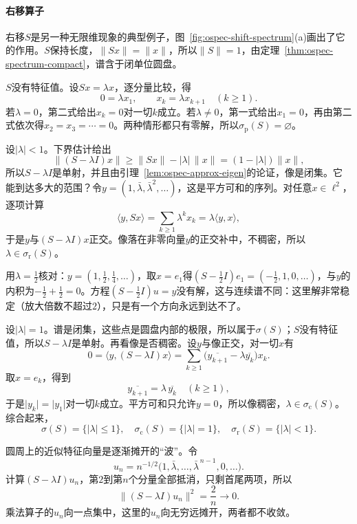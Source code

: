 \paragraph{右移算子}
右移$S$是另一种无限维现象的典型例子，图~\ref{fig:ospec-shift-spectrum}(a)画出了它的作用。$S$保持长度，$\lVert Sx\rVert=\lVert x\rVert$，所以$\lVert S\rVert=1$，由定理~\ref{thm:ospec-spectrum-compact}，谱含于闭单位圆盘。

$S$没有特征值。设$Sx=\lambda x$，逐分量比较，得
\[
0=\lambda x_1,\qquad x_k=\lambda x_{k+1}\quad(k\geq1).
\]
若$\lambda=0$，第二式给出$x_k=0$对一切$k$成立。若$\lambda\neq0$，第一式给出$x_1=0$，再由第二式依次得$x_2=x_3=\cdots=0$。两种情形都只有零解，所以$\sigma_{\mathrm p}(S)=\varnothing$。

设$\lvert\lambda\rvert<1$。下界估计给出
\[
\lVert(S-\lambda I)x\rVert\geq\lVert Sx\rVert-\lvert\lambda\rvert\,\lVert x\rVert=(1-\lvert\lambda\rvert)\lVert x\rVert,
\]
所以$S-\lambda I$是单射，并且由引理~\ref{lem:ospec-approx-eigen}的论证，像是闭集。它能到达多大的范围？令$y=(1,\bar\lambda,\bar\lambda^2,\ldots)$，这是平方可和的序列。对任意$x\in\ell^2$，逐项计算
\[
\langle y,Sx\rangle=\sum_{k\geq1}\lambda^kx_k=\lambda\langle y,x\rangle,
\]
于是$y$与$(S-\lambda I)x$正交。像落在非零向量$y$的正交补中，不稠密，所以$\lambda\in\sigma_{\mathrm r}(S)$。

用$\lambda=\frac12$核对：$y=(1,\frac12,\frac14,\ldots)$，取$x=e_1$得$(S-\frac12I)e_1=(-\frac12,1,0,\ldots)$，与$y$的内积为$-\frac12+\frac12=0$。方程$(S-\frac12I)u=y$没有解，这与连续谱不同：这里解非常稳定（放大倍数不超过$2$），只是有一个方向永远到达不了。

设$\lvert\lambda\rvert=1$。谱是闭集，这些点是圆盘内部的极限，所以属于$\sigma(S)$；$S$没有特征值，所以$S-\lambda I$是单射。再看像是否稠密。设$y$与像正交，对一切$x$有
\[
0=\langle y,(S-\lambda I)x\rangle=\sum_{k\geq1}\bigl(\overline{y_{k+1}}-\lambda\overline{y_k}\bigr)x_k .
\]
取$x=e_k$，得到
\[
\overline{y_{k+1}}=\lambda\,\overline{y_k}\quad(k\geq1),
\]
于是$\lvert y_k\rvert=\lvert y_1\rvert$对一切$k$成立。平方可和只允许$y=0$，所以像稠密，$\lambda\in\sigma_{\mathrm c}(S)$。综合起来，
\begin{equation}
\sigma(S)=\{\lvert\lambda\rvert\leq1\},\quad\sigma_{\mathrm c}(S)=\{\lvert\lambda\rvert=1\},\quad\sigma_{\mathrm r}(S)=\{\lvert\lambda\rvert<1\}.
\label{eq:ospec-shift-spectrum}
\end{equation}

圆周上的近似特征向量是逐渐摊开的“波”。令
\[
u_n=n^{-1/2}\bigl(1,\bar\lambda,\ldots,\bar\lambda^{\,n-1},0,\ldots\bigr).
\]
计算$(S-\lambda I)u_n$，第$2$到第$n$个分量全部抵消，只剩首尾两项，所以
\[
\lVert(S-\lambda I)u_n\rVert^2=\frac2n\to0.
\]
乘法算子的$u_n$向一点集中，这里的$u_n$向无穷远摊开，两者都不收敛。

